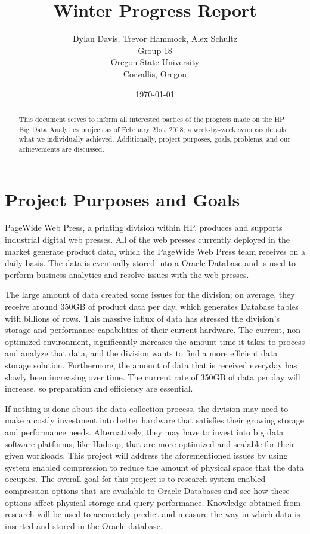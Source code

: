 \documentclass[10pt]{article}
\title{Winter Progress Report}
\author{
	Dylan Davis, Trevor Hammock, Alex Schultz \\
    Group 18 \\
	Oregon State University\\
	Corvallis, Oregon
}
\date{\today}
\begin{document}
\begin{titlingpage}
\maketitle

\begin{abstract}
This document serves to inform all interested parties of the progress made on the HP Big Data Analytics project as of February 21st, 2018; a week-by-week synopsis details what we individually achieved. Additionally, project purposes, goals, problems, and our achievements are discussed.
\end{abstract}
\end{titlingpage}


\tableofcontents
\clearpage

\section{Project Purposes and Goals}
PageWide Web Press, a printing division within HP, produces and supports industrial digital web presses. All of the web presses currently deployed  in the market generate product data, which the PageWide Web Press team receives on a daily basis. The data is eventually stored into a Oracle Database and is used to perform business analytics and resolve issues with the web presses.

The large amount of data created some issues for the division; on average, they receive around 350GB of product data per day, which generates Database tables with billions of rows. This massive influx of data has stressed the division's storage and performance capabilities of their current hardware. The current, non-optimized environment, significantly increases the amount time it takes to process and analyze that data, and the division wants to find a more efficient data storage solution. Furthermore, the amount of data that is received everyday has slowly been increasing over time. The current rate of 350GB of data per day will increase, so preparation and efficiency are essential.

If nothing is done about the data collection process, the division may need to make a costly investment into better hardware that satisfies their growing storage and performance needs. Alternatively, they may have to invest into big data software platforms, like Hadoop, that are more optimized and scalable for their given workloads. This project will address the aforementioned issues by using system enabled compression to reduce the amount of physical space that the data occupies. The overall goal for this project is to research system enabled compression options that are available to Oracle Databases and see how these options affect physical storage and query performance. Knowledge obtained from research will be used to accurately predict and measure the way in which data is inserted and stored in the Oracle database.
\end{document}
